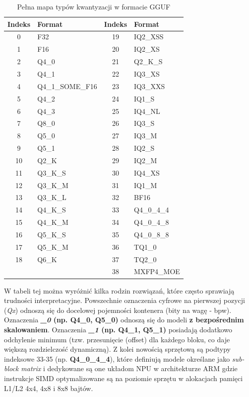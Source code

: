 \begin{table}[h]
\centering
\caption{Pełna mapa typów kwantyzacji w formacie GGUF}
\label{tab:gguf_map_full}
\begin{tabular}{|c|l|c|l|}
\hline
\textbf{Indeks} & \textbf{Format} & \textbf{Indeks} & \textbf{Format} \\ \hline
0 & F32 & 19 & IQ2\_XSS \\ \hline
1 & F16 & 20 & IQ2\_XS \\ \hline
2 & Q4\_0 & 21 & Q2\_K\_S \\ \hline
3 & Q4\_1 & 22 & IQ3\_XS \\ \hline
4 & Q4\_1\_SOME\_F16 & 23 & IQ3\_XXS \\ \hline
5 & Q4\_2 & 24 & IQ1\_S \\ \hline
6 & Q4\_3 & 25 & IQ4\_NL \\ \hline
7 & Q8\_0 & 26 & IQ3\_S \\ \hline
8 & Q5\_0 & 27 & IQ3\_M \\ \hline
9 & Q5\_1 & 28 & IQ2\_S \\ \hline
10 & Q2\_K & 29 & IQ2\_M \\ \hline
11 & Q3\_K\_S & 30 & IQ4\_XS \\ \hline
12 & Q3\_K\_M & 31 & IQ1\_M \\ \hline
13 & Q3\_K\_L & 32 & BF16 \\ \hline
14 & Q4\_K\_S & 33 & Q4\_0\_4\_4 \\ \hline
15 & Q4\_K\_M & 34 & Q4\_0\_4\_8 \\ \hline
16 & Q5\_K\_S & 35 & Q4\_0\_8\_8 \\ \hline
17 & Q5\_K\_M & 36 & TQ1\_0 \\ \hline
18 & Q6\_K & 37 & TQ2\_0 \\ \hline
 &  & 38 & MXFP4\_MOE \\ \hline
\end{tabular}
\end{table}

W tabeli tej można wyróżnić kilka rodzin rozwiązań, które często sprawiają trudności interpretacyjne. Powszechnie oznaczenia cyfrowe na pierwszej pozycji (\textit{Qx}) odnoszą się do docelowej pojemności kontenera (bity na wagę - bpw). Oznaczenia \textbf{\textit{\_0} (np. Q4\_0, Q5\_0)} odnoszą się do modeli \textbf{z bezpośrednim skalowaniem}. Oznaczenia \textbf{\textit{\_1} (np. Q4\_1, Q5\_1)} posiadają dodatkowo odchylenie minimum (tzw. przesunięcie (offset) dla każdego bloku, co daje większą rozdzielczość dynamiczną). Z kolei nowością sprzętową są podtypy indeksowe 33-35 (np. \textbf{Q4\_0\_4\_4}), które definiują modele określane jako \textit{sub-block matrix} i dedykowane są one układom NPU w architekturze ARM gdzie instrukcje SIMD optymalizowane są na poziomie sprzętu w alokacjach pamięci L1/L2 4x4, 4x8 i 8x8 bajtów.

